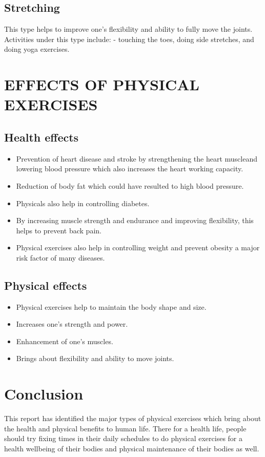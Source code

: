 \documentclass[12pt]{article}
\begin{document}
\subsection{Stretching}
This type helps to improve one’s flexibility and ability to fully move the joints. Activities under this type include: - touching the toes, doing side stretches, and doing yoga exercises.

\section{EFFECTS OF PHYSICAL EXERCISES}

\subsection{Health effects}

\begin{itemize}
\item 	Prevention of heart disease and stroke by strengthening the heart muscleand lowering blood pressure which also increases the heart working capacity.

\item	Reduction of body fat which could have resulted to high blood pressure.

\item 	 Physicals also help in controlling diabetes.

\item 	 By increasing muscle strength and endurance and improving flexibility, this helps to prevent back pain.

\item	 Physical exercises also help in controlling weight and prevent obesity a major risk factor of many diseases.

\end{itemize}

\subsection{Physical effects}
\begin{itemize}
\item  	 Physical exercises help to maintain the body shape and size.

\item	 Increases one’s strength and power.

\item	 Enhancement of one’s muscles.

\item	 Brings about flexibility and ability to move joints.

\end{itemize}

\section{Conclusion}
This report has identified the major types of physical exercises which bring about the health and physical benefits to human life. There for a health life, people should try fixing times in their daily schedules to do physical exercises for a health wellbeing of their bodies and physical maintenance of their bodies as well. 
\end{document}
